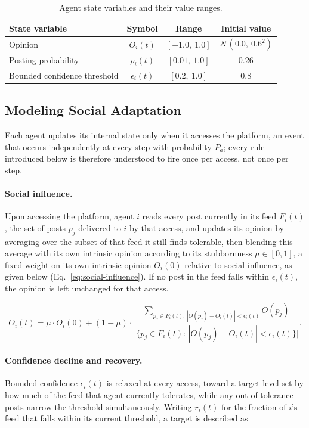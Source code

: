 \documentclass{svproc}
\def\post{\rho}                 %
\def\BoundedConfidence{\epsilon} %
\def\feed{F}                    %
\def\Stubbornness{\mu}           %
\begin{document}
\begin{table}[t]
\centering
\caption{Agent state variables and their value ranges.}\label{tab:state}
\begin{tabular}{lccc}
\toprule
State variable & Symbol & Range & Initial value \\
\midrule
Opinion & $O_i(t)$ & $[-1.0,\ 1.0]$ & $\mathcal{N}(0.0,\ 0.6^2)$ \\
Posting probability & $\post_i(t)$ & $[0.01,\ 1.0]$ & $0.26$ \\
Bounded confidence threshold & $\BoundedConfidence_i(t)$ & $[0.2,\ 1.0]$ & $0.8$ \\
\bottomrule
\end{tabular}
\end{table}

\subsection{Modeling Social Adaptation}\label{sec:model-adaptation}
Each agent updates its internal state only when 
it accesses the platform, an event that occurs 
independently at every step with probability $P_a$; 
every rule introduced below is therefore understood 
to fire once per access, not once per step.

\paragraph{Social influence.} 
Upon accessing
the platform, agent $i$ reads every post currently
in its feed $\feed_i(t)$, the set of posts $p_j$
delivered to $i$ by that access, and updates
its opinion by averaging over the subset of that
feed it still finds tolerable, then blending this
average with its own intrinsic opinion according
to its stubbornness $\Stubbornness\in[0,1]$, a
fixed weight on its own intrinsic opinion $O_i(0)$
relative to social influence, as given below
(Eq.~\eqref{eq:social-influence}).
If no post in the feed falls within $\BoundedConfidence_i(t)$, 
the opinion is left unchanged for that access.

\begin{equation}
O_i(t) = \Stubbornness\cdot O_i(0) + (1-\Stubbornness)\cdot\frac{\sum_{p_j\in \feed_i(t):\,|O(p_j)-O_i(t)|<\BoundedConfidence_i(t)} O(p_j)}{\big|\{p_j\in \feed_i(t):\,|O(p_j)-O_i(t)|<\BoundedConfidence_i(t)\}\big|}.
\label{eq:social-influence}
\end{equation}

\paragraph{Confidence decline and recovery.} 
Bounded confidence $\BoundedConfidence_i(t)$ is relaxed
at every access, toward a target level set by
how much of the feed that agent currently
tolerates, while any out-of-tolerance posts
narrow the threshold simultaneously.
Writing $r_i(t)$ for the fraction of $i$'s feed 
that falls within its current threshold, 
a target is described as 
\end{document}
